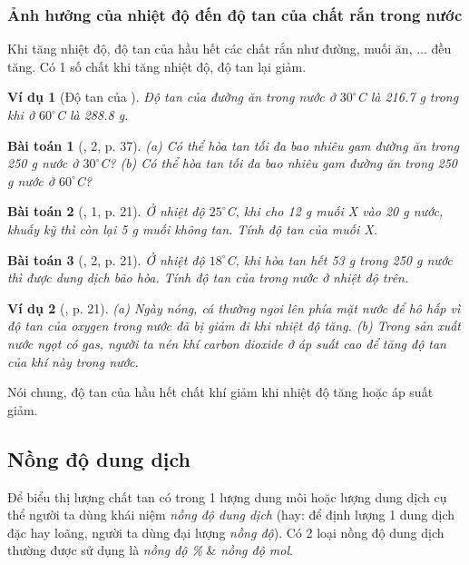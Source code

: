 \documentclass{article}
\newtheorem{baitoan}{Bài toán}
\newtheorem{vidu}{Ví dụ}
\begin{document}
\subsubsection{Ảnh hưởng của nhiệt độ đến độ tan của chất rắn trong nước}
Khi tăng nhiệt độ, độ tan của hầu hết các chất rắn như đường, muối ăn, $\ldots$ đều tăng. Có 1 số chất khi tăng nhiệt độ, độ tan lại giảm.

\begin{vidu}[Độ tan của ]
	Độ tan của đường ăn trong nước ở $30^\circ$\emph{C} là \emph{216.7 g} trong khi ở $60^\circ$\emph{C} là \emph{288.8 g}.
\end{vidu}

\begin{baitoan}[\cite{SGK_KHTN_8_Canh_Dieu}, 2, p. 37]
	(a) Có thể hòa tan tối đa bao nhiêu gam đường ăn trong \emph{250 g} nước ở $30^\circ$\emph{C}? (b) Có thể hòa tan tối đa bao nhiêu gam đường ăn trong \emph{250 g} nước ở $60^\circ$\emph{C}?
\end{baitoan}

\begin{baitoan}[\cite{SGK_KHTN_8_KNTTVCS}, 1, p. 21]
	Ở nhiệt độ $25^\circ$\emph{C}, khi cho \emph{12 g} muối X vào \emph{20 g} nước, khuấy kỹ thì còn lại \emph{5 g} muối không tan. Tính độ tan của muối X.
\end{baitoan}

\begin{baitoan}[\cite{SGK_KHTN_8_KNTTVCS}, 2, p. 21]
	Ở nhiệt độ $18^\circ$\emph{C}, khi hòa tan hết \emph{53 g} \emph{} trong \emph{250 g} nước thì được dung dịch bão hòa. Tính độ tan của \emph{} trong nước ở nhiệt độ trên.
\end{baitoan}

\begin{vidu}[\cite{SGK_KHTN_8_KNTTVCS}, p. 21]
	(a) Ngày nóng, cá thường ngoi lên phía mặt nước để hô hấp vì độ tan của oxygen trong nước đã bị giảm đi khi nhiệt độ tăng. (b) Trong sản xuất nước ngọt có gas, người ta nén khí carbon dioxide ở áp suất cao để tăng độ tan của khí này trong nước.
\end{vidu}
Nói chung, độ tan của hầu hết chất khí giảm khi nhiệt độ tăng hoặc áp suất giảm.

\subsection{Nồng độ dung dịch}
Để biểu thị lượng chất tan có trong 1 lượng dung môi hoặc lượng dung dịch cụ thể người ta dùng khái niệm \textit{nồng độ dung dịch} (hay: để định lượng 1 dung dịch đặc hay loãng, người ta dùng đại lượng \textit{nồng độ}). Có 2 loại nồng độ dung dịch thường được sử dụng là \textit{nồng độ \%} \& \textit{nồng độ mol}.
\end{document}
